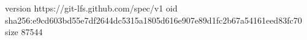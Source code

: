version https://git-lfs.github.com/spec/v1
oid sha256:e9cd603bd55e7df2644dc5315a1805d616e907e89d1fc2b67a54161eed83fc70
size 87544
